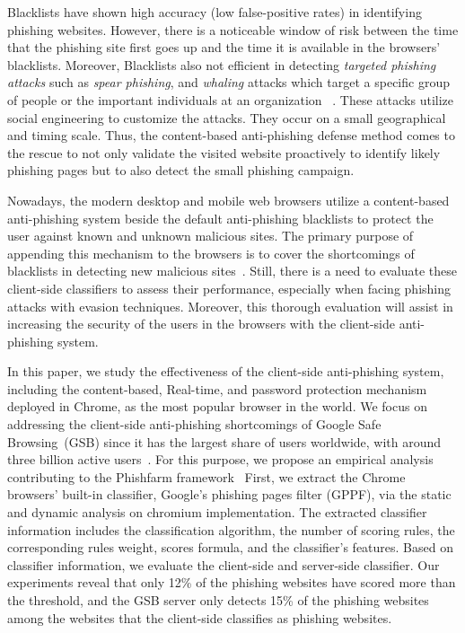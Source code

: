\documentclass[letterpaper,twocolumn,10pt]{article}
\begin{document}
Blacklists have shown high accuracy (low false-positive rates) in identifying phishing websites. However, there is a noticeable window of risk between the time that the phishing site first goes up and the time it is available in the browsers' blacklists. Moreover, Blacklists also not efficient in detecting \textit{targeted phishing attacks} such as \textit{spear phishing}, and \textit{whaling} attacks which target a specific group of people or the important individuals at an organization ~\cite{burns2019spear}. These attacks utilize social engineering to customize the attacks. They occur on a small geographical and timing scale. Thus, the content-based anti-phishing defense method comes to the rescue to not only validate the visited website proactively to identify likely phishing pages but to also detect the small phishing campaign.

Nowadays, the modern desktop and mobile web browsers utilize a content-based anti-phishing system beside the default anti-phishing blacklists to protect the user against known and unknown malicious sites. The primary purpose of appending this mechanism to the browsers is to cover the shortcomings of blacklists in detecting new malicious sites~\cite{googlechromeprivacywhitepaper}. Still, there is a need to evaluate these client-side classifiers to assess their performance, especially when facing phishing attacks with evasion techniques. Moreover, this thorough evaluation will assist in increasing the security of the users in the browsers with the client-side anti-phishing system.

In this paper, we study the effectiveness of the client-side anti-phishing system, including the content-based, Real-time, and password protection mechanism deployed in Chrome, as the most popular browser in the world. We focus on addressing the client-side anti-phishing shortcomings of Google Safe Browsing~(GSB) since it has the largest share of users worldwide, with around three billion active users~\cite{statcounterall}.
For this purpose, we propose an empirical analysis contributing to the Phishfarm framework~\cite{oest2019phishfarm}
First, we extract the Chrome browsers' built-in classifier, Google's phishing pages filter (GPPF), via the static and dynamic analysis on chromium implementation. 
The extracted classifier information includes the classification algorithm, the number of scoring rules, the corresponding rules weight, scores formula, and the classifier's features. 
Based on classifier information, we evaluate the client-side and server-side classifier. Our experiments reveal that only 12\%  of the phishing websites have scored more than the threshold, and the GSB server only detects 15\%  of the phishing websites among the websites that the client-side classifies as phishing websites. 
\end{document}

